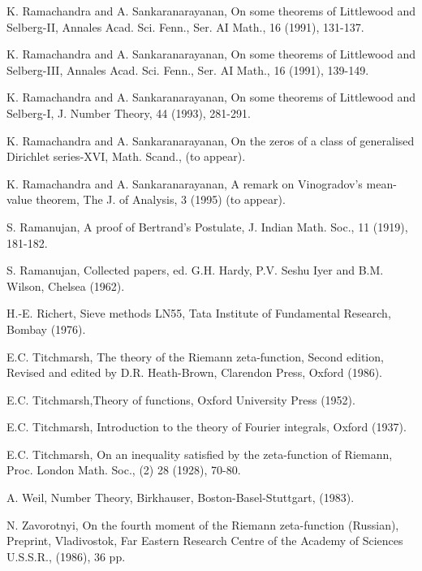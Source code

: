 \begin{thebibliography}{99}
 K. Ramachandra and A. Sankaranarayanan, On some theorems of Littlewood and Selberg-II, Annales Acad. Sci. Fenn., Ser. AI Math., 16 (1991), 131-137.

 K. Ramachandra and A. Sankaranarayanan, On some theorems of Littlewood and Selberg-III, Annales Acad. Sci. Fenn., Ser. AI Math., 16 (1991), 139-149.

 K. Ramachandra and A. Sankaranarayanan, On some theorems of Littlewood and Selberg-I, J. Number Theory, 44 (1993), 281-291.

 K. Ramachandra and A. Sankaranarayanan, On the zeros of a class of generalised Dirichlet series-XVI, Math. Scand., (to appear).

 K. Ramachandra and A. Sankaranarayanan, A remark on Vinogradov's mean-value theorem, The J. of Analysis, 3 (1995) (to appear).

 S. Ramanujan, A proof of Bertrand's Postulate, J. Indian Math. Soc., 11 (1919), 181-182.

 S. Ramanujan, Collected papers, ed. G.H. Hardy, P.V. Seshu Iyer and B.M. Wilson, Chelsea (1962).

 H.-E. Richert, Sieve methods LN55, Tata Institute of Fundamental 
Research, Bombay (1976).

 E.C. Titchmarsh, The theory of the Riemann zeta-function, Second edition, Revised and edited by D.R. Heath-Brown, Clarendon Press, Oxford (1986).

 E.C. Titchmarsh,\pageoriginale Theory of functions, Oxford University Press (1952).

 E.C. Titchmarsh, Introduction to the theory of Fourier integrals, Oxford (1937).

 E.C. Titchmarsh, On an inequality satisfied by the zeta-function of Riemann, Proc. London Math. Soc., (2) 28 (1928),  70-80.

 A. Weil, Number Theory, Birkhauser, Boston-Basel-Stuttgart, (1983).

 N. Zavorotnyi, On the fourth moment of the Riemann zeta-function (Russian), Preprint, Vladivostok, Far Eastern Research Centre of the Academy of Sciences U.S.S.R., (1986), 36 pp.

\end{thebibliography}
